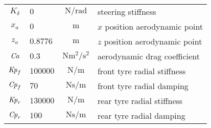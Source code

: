 \begin{longtable}{clcl}
$K_\delta$   & $0       $ & $\si{\newton/\radian}$         & steering stiffness                  \\
$x_a    $    & $0       $ & $\si{\metre}$                  & $x$ position aerodynamic point      \\
$z_a    $    & $0.8776  $ & $\si{\metre}$                  & $z$ position aerodynamic point      \\
$\it Ca $    & $0.3     $ & $\si{\newton\metre^2/\second^2}$ & aerodynamic drag coefficient      \\
${\it Kp}_f$ & $100000  $ & $\si{\newton/\metre}$          & front tyre radial stiffness         \\
${\it Cp}_f$ & $70      $ & $\si{\newton\second/\metre}$   & front tyre radial damping           \\
${\it Kp}_r$ & $130000  $ & $\si{\newton/\metre}$          & rear tyre radial stiffness          \\
${\it Cp}_r$ & $100     $ & $\si{\newton\second/\metre}$   & rear tyre radial damping            \\
\end{longtable}

%
